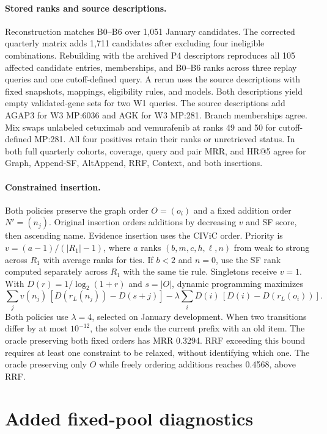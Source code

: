 \documentclass[runningheads]{llncs}
\begin{document}
\paragraph{Stored ranks and source descriptions.}
Reconstruction matches B0--B6 over 1,051 January candidates. The corrected quarterly matrix adds 1,711 candidates after excluding four ineligible combinations. Rebuilding with the archived P4 descriptors reproduces all 105 affected candidate entries, memberships, and B0--B6 ranks across three replay queries and one cutoff-defined query. A rerun uses the source descriptions with fixed snapshots, mappings, eligibility rules, and models. Both descriptions yield empty validated-gene sets for two W1 queries. The source descriptions add AGAP3 for W3 MP:6036 and AGK for W3 MP:281. Branch memberships agree. Mix swaps unlabeled cetuximab and vemurafenib at ranks 49 and 50 for cutoff-defined MP:281. All four positives retain their ranks or unretrieved status. In both full quarterly cohorts, coverage, query and pair MRR, and HR@5 agree for Graph, Append-SF, AltAppend, RRF, Context, and both insertions.

\paragraph{Constrained insertion.}
Both policies preserve the graph order \(O=(o_i)\) and a fixed addition order \(N'=(n_j)\). Original insertion orders additions by decreasing \(v\) and SF score, then ascending name. Evidence insertion uses the CIViC order. Priority is \(v=(a-1)/(|R_1|-1)\), where \(a\) ranks \((b,m,c,h,\ell,n)\) from weak to strong across \(R_1\) with average ranks for ties. If \(b<2\) and \(n=0\), use the SF rank computed separately across \(R_1\) with the same tie rule. Singletons receive \(v=1\). With \(D(r)=1/\log_2(1+r)\) and \(s=|O|\), dynamic programming maximizes
\[
  \sum_j v(n_j)\,[D(r_L(n_j))-D(s+j)]
  -\lambda\sum_i D(i)\,[D(i)-D(r_L(o_i))].
\]
Both policies use \(\lambda=4\), selected on January development. When two transitions differ by at most \(10^{-12}\), the solver ends the current prefix with an old item. The oracle preserving both fixed orders has MRR 0.3294. RRF exceeding this bound requires at least one constraint to be relaxed, without identifying which one. The oracle preserving only \(O\) while freely ordering additions reaches 0.4568, above RRF.

\section{Added fixed-pool diagnostics}
\end{document}
